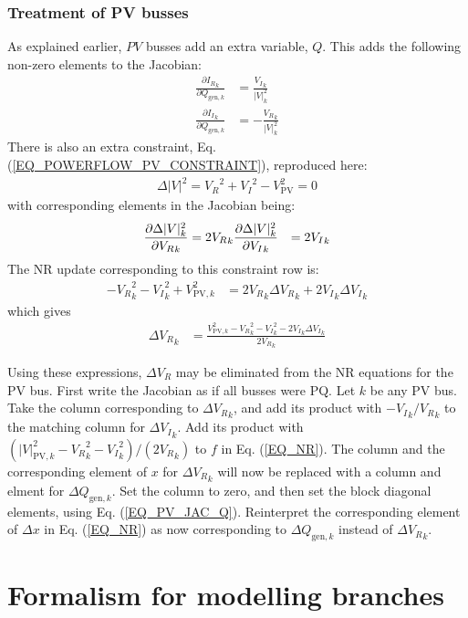 \documentclass[11pt]{article}
\newcommand{\Vr}{{V_R}}
\newcommand{\Vi}{{V_I}}
\newcommand{\Ir}{{I_R}}
\newcommand{\Ii}{{I_I}}
\begin{document}
\subsubsection{Treatment of PV busses}
As explained earlier, $PV$ busses add an extra variable, $Q$. This adds the following non-zero elements to the Jacobian:
\begin{align}
\frac{\partial \Ir_k}{\partial Q_{\text{gen},k}} &= \frac{\Vi_k}{|V|_k^2} \\
\frac{\partial \Ii_k}{\partial Q_{\text{gen},k}} &= -\frac{\Vr_k}{|V|_k^2}
\end{align}
There is also an extra constraint, Eq. (\ref{EQ_POWERFLOW_PV_CONSTRAINT}), reproduced here:
\begin{align}
\Delta |V|^2 = \Vr^2 + \Vi^2 - V_\text{PV}^2 = 0
\label{EQ_POWERFLOW_PV_CONSTRAINT_AGAIN}
\end{align}
with corresponding elements in the Jacobian being:
\begin{align}
\frac{\partial \Delta|V|^2_k}{\partial \Vr_k} &= 2 \Vr_k \notag
\frac{\partial \Delta|V|^2_k}{\partial \Vi_k} &= 2 \Vi_k
\label{EQ_PV_JAC_Q}
\end{align}
The NR update corresponding to this constraint row is:
\begin{align}
	-\Vr_k^2 - \Vi_k^2 + V_{\text{PV},k}^2 &= 2\Vr_k\Delta\Vr_k + 2\Vi_k\Delta\Vi_k
\end{align}
which gives
\begin{align}
\Delta \Vr_k &= \frac{V^2_{\text{PV},k} - \Vr_k^2 - \Vi_k^2- 2\Vi_k\Delta \Vi_k}{2\Vr_k}
\end{align}

Using these expressions, $\Delta \Vr$ may be eliminated from the NR equations for the PV bus. First write the Jacobian as if all busses were PQ. Let $k$ be any PV bus. Take the column corresponding to $\Delta \Vr_k$, and add its product with $-\Vi_k/\Vr_k$ to the matching column for  $\Delta \Vi_k$. Add its product with $(|V|^2_{\text{PV},k} - \Vr_k^2 - \Vi_k^2)/(2\Vr_k)$ to $f$ in Eq. (\ref{EQ_NR}). The column and the corresponding element of $x$ for $\Delta \Vr_k$ will now be replaced with a column and elment for $\Delta Q_{\text{gen},k}$. Set the column to zero, and then set the block diagonal elements, using Eq. (\ref{EQ_PV_JAC_Q}). Reinterpret the corresponding element of $\Delta x$ in Eq. (\ref{EQ_NR}) as now corresponding to $\Delta Q_{\text{gen},k}$ instead of $\Delta \Vr_k$.

\section{Formalism for modelling branches}
\end{document}
